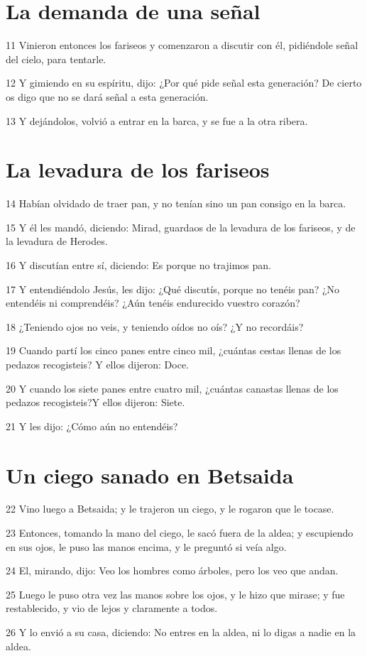 \section*{La demanda de una señal}

\par 11 Vinieron entonces los fariseos y comenzaron a discutir con él, pidiéndole señal del cielo, para tentarle.
\par 12 Y gimiendo en su espíritu, dijo: ¿Por qué pide señal esta generación? De cierto os digo que no se dará señal a esta generación.
\par 13 Y dejándolos, volvió a entrar en la barca, y se fue a la otra ribera.

\section*{La levadura de los fariseos}

\par 14 Habían olvidado de traer pan, y no tenían sino un pan consigo en la barca.
\par 15 Y él les mandó, diciendo: Mirad, guardaos de la levadura de los fariseos, y de la levadura de Herodes.
\par 16 Y discutían entre sí, diciendo: Es porque no trajimos pan.
\par 17 Y entendiéndolo Jesús, les dijo: ¿Qué discutís, porque no tenéis pan? ¿No entendéis ni comprendéis? ¿Aún tenéis endurecido vuestro corazón?
\par 18 ¿Teniendo ojos no veis, y teniendo oídos no oís? ¿Y no recordáis?
\par 19 Cuando partí los cinco panes entre cinco mil, ¿cuántas cestas llenas de los pedazos recogisteis? Y ellos dijeron: Doce.
\par 20 Y cuando los siete panes entre cuatro mil, ¿cuántas canastas llenas de los pedazos recogisteis?Y ellos dijeron: Siete.
\par 21 Y les dijo: ¿Cómo aún no entendéis?

\section*{Un ciego sanado en Betsaida}

\par 22 Vino luego a Betsaida; y le trajeron un ciego, y le rogaron que le tocase.
\par 23 Entonces, tomando la mano del ciego, le sacó fuera de la aldea; y escupiendo en sus ojos, le puso las manos encima, y le preguntó si veía algo.
\par 24 El, mirando, dijo: Veo los hombres como árboles, pero los veo que andan.
\par 25 Luego le puso otra vez las manos sobre los ojos, y le hizo que mirase; y fue restablecido, y vio de lejos y claramente a todos.
\par 26 Y lo envió a su casa, diciendo: No entres en la aldea, ni lo digas a nadie en la aldea.

